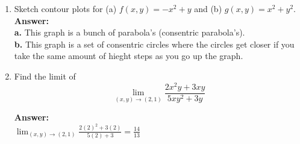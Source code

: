 \documentclass[11pt]{article}
\begin{document}
\begin{enumerate}
   
   \item Sketch contour plots for (a) $f(x,y) = -x^2+y$ and (b) $g(x,y) = x^2+y^2$.
   \\
   \textbf{Answer:}
   \\
   \textbf{a.}
   This graph is a bunch of parabola's (consentric parabola's).
   \\
   
   \textbf{b.}
   This graph is a set of consentric circles where the circles get closer if you take the same amount of hieght steps as you go up the graph.
   
   
   
   \item Find the limit of 
   \[
       \lim_{(x,y) \to (2,1)} \frac{2x^2y +  3xy}{5xy^2 + 3y}
   \]
   
   \textbf{Answer:}
   \\
   $\lim_{(x,y) \to (2,1)} \frac{2(2)^2 +  3(2)}{5(2) + 3}= \frac{14}{13}$
   
   
   
    

\end{enumerate}
\end{document}
